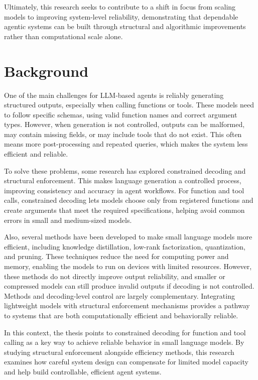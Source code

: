 Ultimately, this research seeks to contribute to a shift in focus from
scaling models to improving system-level reliability, demonstrating that
dependable agentic systems can be built through structural and algorithmic
improvements rather than computational scale alone.

\section{Background}

One of the main challenges for LLM-based agents is reliably generating
structured outputs, especially when calling functions or tools. These models
need to follow specific schemas, using valid function names and correct
argument types. However, when generation is not controlled, outputs can be
malformed, may contain missing fields, or may include tools that do not exist.
This often means more post-processing and repeated queries, which makes the
system less efficient and reliable.

To solve these problems, some research has explored constrained decoding and
structural enforcement. This makes language generation a controlled process,
improving consistency and accuracy in agent workflows. For function and tool
calls, constrained decoding lets models choose only from registered functions
and create arguments that meet the required specifications, helping avoid
common errors in small and medium-sized models.

Also, several methods have been developed to make small language models more
efficient, including knowledge distillation, low-rank factorization,
quantization, and pruning. These techniques reduce the need for computing power
and memory, enabling the models to run on devices with limited resources.
However, these methods do not directly improve output reliability, and smaller
or compressed models can still produce invalid outputs if decoding is not
controlled. Methods and decoding-level control are largely complementary.
Integrating lightweight models with structural enforcement mechanisms provides
a pathway to systems that are both computationally efficient and behaviorally
reliable.

In this context, the thesis points to constrained decoding for function and
tool calling as a key way to achieve reliable behavior in small language
models. By studying structural enforcement alongside efficiency methods, this
research examines how careful system design can compensate for limited model
capacity and help build controllable, efficient agent systems.

